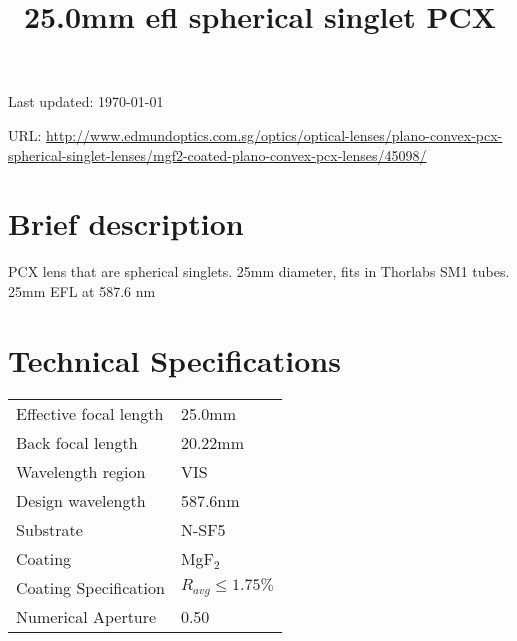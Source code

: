 \documentclass{article}
\title{\vspace{-4cm}25.0mm efl spherical singlet PCX}
\date{}
\begin{document}
\maketitle

\vspace{-1cm}

Last updated: \today

URL: \url{http://www.edmundoptics.com.sg/optics/optical-lenses/plano-convex-pcx-spherical-singlet-lenses/mgf2-coated-plano-convex-pcx-lenses/45098/}

\begin{multicols}{2}

\section{Brief description}

PCX lens that are spherical singlets. 25mm diameter, fits in Thorlabs SM1 tubes. 25mm EFL at 587.6 nm



\section{Technical Specifications}


\begin{tabular}{|l|l|}
  Effective focal length & 25.0mm \\
  Back focal length & 20.22mm\\
  Wavelength region & VIS \\
  Design wavelength & 587.6nm \\
  Substrate & N-SF5 \\
  Coating & MgF$_{2}$ \\
  Coating Specification & $R_{avg} \leq 1.75\%$ \\
  Numerical Aperture & 0.50 \\
\end{tabular}%


\end{multicols}
\end{document}
